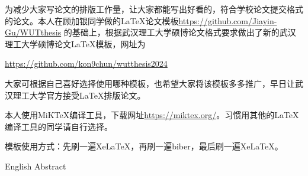 
\begin{WUTChineseabstract}

为减少大家写论文的排版工作量，让大家都能写出好看的，符合学校论文提交格式的论文。本人在顾加银同学做的{\LaTeX}论文模板\url{https://github.com/Jiayin-Gu/WUTthesis} 的基础上，根据武汉理工大学硕博论文格式要求做出了新的武汉理工大学硕博论文{\LaTeX}模板，网址为

\url{https://github.com/kon9chun/wutthesis2024}

大家可根据自己喜好选择使用哪种模板，也希望大家将该模板多多推广，早日让武汉理工大学官方接受{\LaTeX}排版论文。

本人使用MiKTeX编译工具，下载网址\url{https://miktex.org/}。习惯用其他的{\LaTeX}编译工具的同学请自行选择。

模板使用方式：先刷一遍XeLaTeX，再刷一遍biber，最后刷一遍XeLaTeX。

\end{WUTChineseabstract}

\begin{WUTEnglishabstract}

English Abstract
\end{WUTEnglishabstract}





